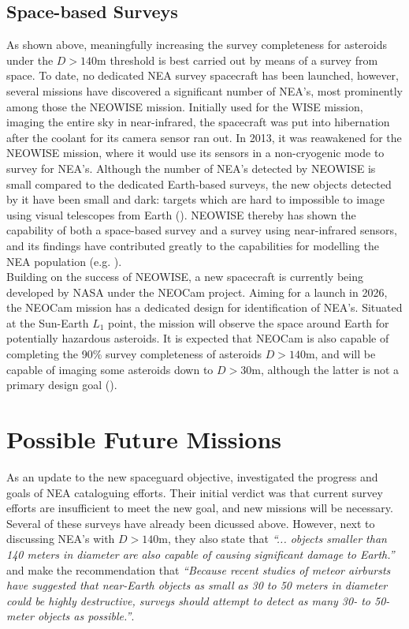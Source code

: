 \subsection{Space-based Surveys}
As shown above, meaningfully increasing the survey completeness for asteroids under the $D > 140 \mathrm{m}$ threshold is best carried out by means of a survey from space. To date, no dedicated NEA survey spacecraft has been launched, however, several missions have discovered a significant number of NEA's, most prominently among those the NEOWISE mission. Initially used for the WISE mission, imaging the entire sky in near-infrared, the spacecraft was put into hibernation after the coolant for its camera sensor ran out. In 2013, it was reawakened for the NEOWISE mission, where it would use its sensors in a non-cryogenic mode to survey for NEA's. Although the number of NEA's detected by NEOWISE is small compared to the dedicated Earth-based surveys, the new objects detected by it have been small and dark: targets which are hard to impossible to image using visual telescopes from Earth (\cite{NEOWISEResult}). NEOWISE thereby has shown the capability of both a space-based survey and a survey using near-infrared sensors, and its findings have contributed greatly to the capabilities for modelling the NEA population (e.g. \cite{GranvikPopulation}).\\

Building on the success of NEOWISE, a new spacecraft is currently being developed by NASA under the NEOCam project. Aiming for a launch in 2026, the NEOCam mission has a dedicated design for identification of NEA's. Situated at the Sun-Earth $L_1$ point, the mission will observe the space around Earth for potentially hazardous asteroids. It is expected that NEOCam is also capable of completing the 90\% survey completeness of asteroids $D > 140 \mathrm{m}$, and will be capable of imaging some asteroids down to $D > 30 \mathrm{m}$, although the latter is not a primary design goal (\cite{NEOCam}).

\section{Possible Future Missions}
\label{sec:introductionproposals}
As an update to the new spaceguard objective, \cite{DefendingEarth} investigated the progress and goals of NEA cataloguing efforts. Their initial verdict was that current survey efforts are insufficient to meet the new goal, and new missions will be necessary. Several of these surveys have already been dicussed above. However, next to discussing NEA's with $D > 140 \mathrm{m}$, they also state that \textit{``... objects smaller than 140 meters in diameter are also capable of causing significant damage to Earth.''} and make the recommendation that \textit{``Because recent studies of meteor airbursts have suggested that near-Earth objects as small as 30 to 50 meters in diameter could be highly destructive, surveys should attempt to detect as many 30- to 50-meter objects as possible.''}. \\

